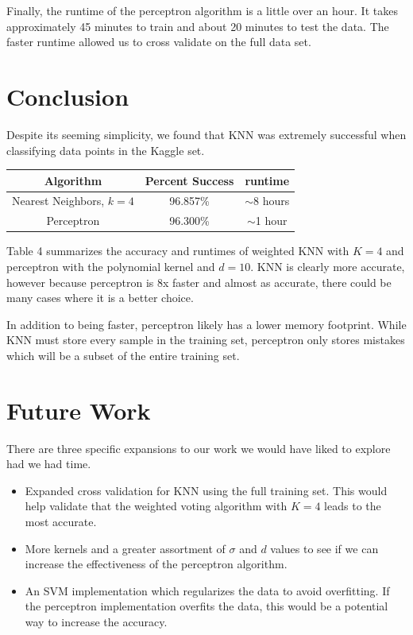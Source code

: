 \documentclass{article} %
\begin{document}
Finally, the runtime of the perceptron algorithm is a little over an hour. It
takes approximately 45 minutes to train and about 20 minutes to test the
data. The faster runtime allowed us to cross validate on the full data set.

\section{Conclusion}
Despite its seeming simplicity, we found that KNN was extremely successful
when classifying data points in the Kaggle set.

\begin{center}
\begin{tabular}{ c| c c}
	\hline
Algorithm & Percent Success & runtime\\
	\hline
Nearest Neighbors, $k = 4$   & 96.857\% & $\sim$8 hours\\
Perceptron   & 96.300\%  & $\sim$1 hour\\
\end{tabular}
\end{center}

Table 4 summarizes the accuracy and runtimes of weighted KNN with $K = 4$ and
perceptron with the polynomial kernel and $d = 10$. KNN is clearly more
accurate, however because perceptron is 8x faster and almost as accurate, there
could be many cases where it is a better choice.

In addition to being faster, perceptron likely has a lower memory
footprint. While KNN must store every sample in the training set, perceptron
only stores mistakes which will be a subset of the entire training set.

\section{Future Work}
There are three specific expansions to our work we would have liked to explore
had we had time.

\begin{itemize}
\item Expanded cross validation for KNN using the full training set. This would
  help validate that the weighted voting algorithm with $K = 4$ leads to the
  most accurate. 
\item More kernels and a greater assortment of $\sigma$ and $d$ values to
  see if we can increase the effectiveness of the perceptron algorithm. 
\item An SVM implementation which regularizes the data to avoid overfitting. If
  the perceptron implementation overfits the data, this would be a potential
  way to increase the accuracy.
\end{itemize}


\begingroup
\renewcommand{\section}[2]{}%

	
\endgroup
\end{document}
